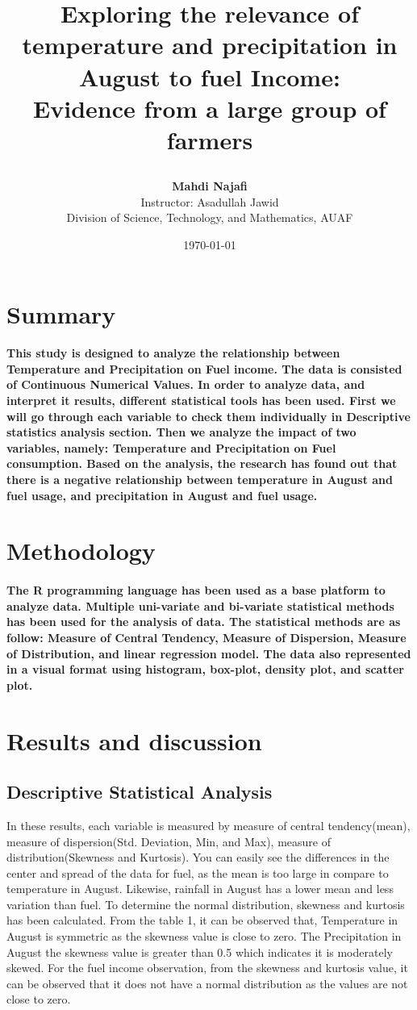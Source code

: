 \documentclass[12pt, a4]{article}
\title{\begin{center}
Exploring the relevance of temperature and precipitation in August to fuel Income:\\ Evidence from a large group of farmers
\end{center}}
\author{
\textbf{Mahdi Najafi}\\
\vspace{3mm}
Instructor: Asadullah Jawid\\
\vspace{3mm}
Division of Science, Technology, and Mathematics, AUAF
}
\date{\today}
\begin{document}
\maketitle
\newpage
\tableofcontents
\newpage
\section{Summary}


\paragraph{This study is designed to analyze the relationship between Temperature and Precipitation on Fuel income.  The data is consisted of Continuous Numerical Values. In order to analyze data, and interpret it results, different statistical tools has been used. First we will go through each variable to check them individually in Descriptive statistics analysis section. Then we analyze the impact of two variables, namely: Temperature and Precipitation on Fuel consumption. Based on the analysis, the research has found out that there is a negative relationship between temperature in August and fuel usage, and precipitation in August and fuel usage.}
\section{Methodology}
\paragraph{The R programming language has been used as a base platform to analyze data. Multiple uni-variate and bi-variate statistical methods has been used for the analysis of data. The statistical methods are as follow: Measure of Central Tendency, Measure of Dispersion, Measure of Distribution, and linear regression model. The data also represented in a visual format using  histogram, box-plot, density plot, and scatter plot.
}
\section{Results and discussion}

\subsection{Descriptive Statistical Analysis}
In these results, each variable is measured by measure of central tendency(mean), measure of dispersion(Std. Deviation, Min, and Max), measure of distribution(Skewness and Kurtosis). You can easily see the differences in the center and spread of the data for fuel, as the mean is too large in compare to temperature in August. Likewise, rainfall in August has a lower mean and less variation than fuel. To determine the normal distribution, skewness and kurtosis has been calculated. From the table 1, it can be observed that, Temperature in August is symmetric as the skewness value is close to zero. The Precipitation in August the skewness value is greater than 0.5 which indicates  it is moderately skewed. For the fuel income observation, from the skewness and kurtosis value, it can be observed that it does not have a normal distribution as the values are not close to zero.
\end{document}
